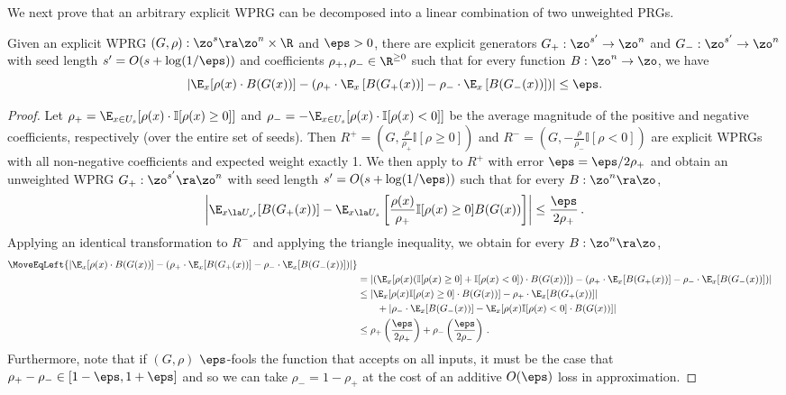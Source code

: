 \documentclass{toc}
\begin{document}
We next prove that an arbitrary explicit WPRG can be decomposed into a linear combination of two unweighted PRGs. %
\begin{proposition}
Given an explicit WPRG $(G,\rho) : \zo^s \ra \zo^n\times \R$ and $\eps>0$, there are 
explicit generators $G_+ : \zo^{s'}\rightarrow \zo^n$ and $G_- : \zo^{s'}\rightarrow \zo^n$ with seed length
$s'=O(s+\log(1/\eps))$ and coefficients $\rho_+,\rho_-\in \R^{\geq 0}$ such that for every function $B : \zo^n\rightarrow \zo$, we have %
\[\left|\E_x[\rho(x)\cdot B(G(x))] - \left( 
\rho_+\cdot \E_x\left[B(G_+(x))\right] - \rho_-\cdot \E_x\left[B(G_-(x))\right]\right)\right|\leq \eps.\]
\end{proposition}
\begin{proof}
Let $\rho_+=\E_{x\in U_s}[\rho(x)\cdot \mathbb{I}[\rho(x)\geq 0]]$ and $\rho_-=-\E_{x\in U_s}[\rho(x)\cdot \mathbb{I}[\rho(x)< 0]]$ be the average magnitude of the positive and negative coefficients,
%
respectively (over the entire set of seeds). Then $R^+=(G,\frac{\rho}{\rho_+}\mathbb{I}[\rho \geq 0])$ and $R^-=(G,-\frac{\rho}{\rho_-}\mathbb{I}[\rho< 0])$ are explicit WPRGs with all non-negative coefficients and expected weight exactly 1. We then apply  to $R^+$ with error $\eps=\eps/2\rho_+$ and obtain an unweighted WPRG $G_+:\zo^{s'}\ra\zo^n$ with seed length $s'=O(s+\log(1/\eps))$ such that for every $B:\zo^n\ra\zo$,
\[\left|\E_{x\la U_{s'}}[B(G_+(x))] - \E_{x\la U_{s}}\left[\frac{\rho(x)}{\rho_+}\mathbb{I}[\rho(x)\geq 0]B(G(x))\right]
\right|\leq \frac{\eps}{2\rho_+}\,.\] %
Applying an identical transformation to $R^-$ and applying the triangle inequality, we obtain for every $B:\zo^n\ra\zo$,
\begin{align*}
%
    \MoveEqLeft{\left|\E_x[\rho(x)\cdot B(G(x))] - \left(\rho_+ \cdot \E_x[B(G_+(x))]-\rho_-\cdot \E_x[B(G_-(x))]\right)\right|}\\ 
    &= \left|\left(\E_x[\rho(x)(\mathbb{I}[\rho(x)\geq 0]+\mathbb{I}[\rho(x)< 0])\cdot B(G(x))] \right)-\left( \rho_+ \cdot \E_x[B(G_+(x))]-\rho_-\cdot \E_x[B(G_-(x))] \right)\right|\\
    &\leq \left|\E_x[\rho(x)\mathbb{I}[\rho(x)\geq 0]\cdot B(G(x))]- \rho_+ \cdot \E_x[B(G_+(x))]\right| \\
%
%
    &\qquad +\left|\rho_-\cdot \E_x[B(G_-(x))]-\E_x[\rho(x)\mathbb{I}[\rho(x)< 0]\cdot B(G(x))]\right|\\
    &\leq \rho_+\left(\frac{\eps}{2\rho_+}\right)+\rho_-\left(\frac{\eps}{2\rho_-}\right)\,.
\end{align*}
%
Furthermore, note that if $(G,\rho)$ $\eps$-fools the function that accepts on all inputs, it must be the case that $\rho_+-\rho_-\in [1- \eps,1+\eps]$ and so we can take $\rho_-=1-\rho_+$ at the cost of an additive $O(\eps)$ loss in approximation.
\end{proof}
\end{document}
